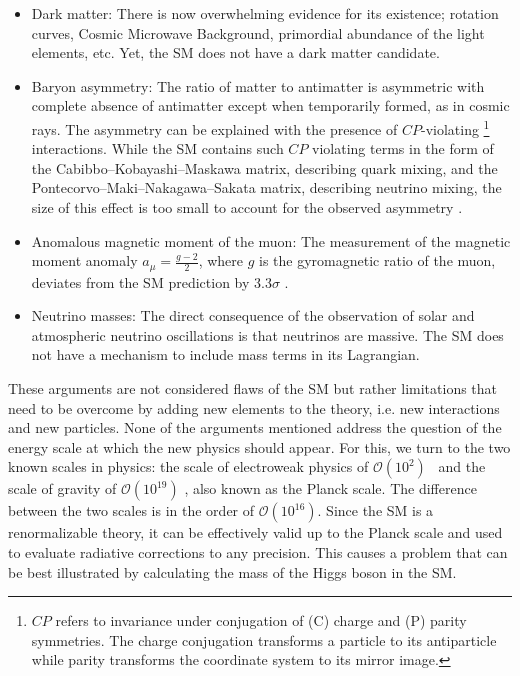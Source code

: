 \begin{itemize}
\item Dark matter: There is now overwhelming evidence for its existence; rotation curves, Cosmic Microwave Background, primordial abundance of the light elements, etc. 
Yet, the SM does not have a dark matter candidate\cite{Bertone:2004pz}.
\item Baryon asymmetry: The ratio of matter to antimatter is asymmetric with complete absence of antimatter except 
when temporarily formed, as in cosmic rays.
The asymmetry can be explained with the presence of $CP$-violating
\footnote{$CP$ refers to invariance under conjugation of (C) charge and (P) parity symmetries. 
The charge conjugation transforms a particle to its antiparticle while parity transforms the coordinate system to its mirror image.}
interactions. While the SM contains such $CP$ violating terms in the form of the Cabibbo–Kobayashi–Maskawa matrix, 
describing  quark mixing, and the Pontecorvo–Maki–Nakagawa–Sakata matrix, describing neutrino 
mixing, the size of this effect is too small to account for the observed asymmetry \cite{Canetti:2012zc}.
\item Anomalous magnetic moment of the muon: The measurement of the magnetic moment anomaly $a_\mu = \frac{g-2}{2}$, where $g$ is the gyromagnetic ratio of the muon, 
deviates from the SM prediction by 3.3$\sigma$ \cite{PhysRevD.73.072003,Hagiwara:2011af}.
\item Neutrino masses: The direct consequence of the observation of solar and atmospheric neutrino oscillations is that neutrinos are massive. The SM does not have a mechanism to include 
mass terms in its Lagrangian\cite{pdg}.
\end{itemize}
These arguments are not considered flaws of the SM but rather limitations that need to be overcome by adding new elements to the theory, i.e. new interactions and new particles.
None of the arguments mentioned address the question of the energy scale at which the new physics should appear.
For this, we turn to the two known scales in physics: the scale of electroweak physics of $\mathcal{O}\left(10^2\right)$ \GeV~and the scale of gravity of $\mathcal{O}\left(10^{19}\right)$ \GeV,
also known as the Planck scale.
The difference between the two scales is in the order of $\mathcal{O}\left(10^{16}\right)$. 
Since the SM is a renormalizable theory, it can be effectively valid up to the Planck scale and 
used to evaluate radiative corrections to any precision.
This causes a problem that can be best illustrated by calculating the mass of the Higgs boson in the SM.
